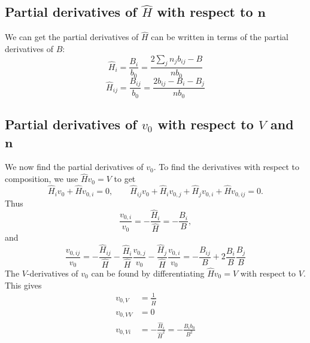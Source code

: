 \documentclass[internal,english]{sintefmemo2012}
\newcommand{\mbn}[0]{\mathbf n}
\newcommand*{\hH}[0]{\hat H}
\numberwithin{equation}{section}
\begin{document}
\subsection*{Partial derivatives of $\hH$ with respect to $\mbn$}
We can get the partial derivatives of $\hH$ can be written in terms of
the partial derivatives of $B$:
\begin{equation}
  \hH_i = \frac{B_i}{b_0} = \frac{2 \sum_j n_j b_{ij} -B}{nb_0}
\end{equation}
\begin{equation}
  \hH_{ij} = \frac{B_{ij}}{b_0} = \frac{2b_{ij}-B_i-B_j}{nb_0}
\end{equation}
\subsection*{Partial derivatives of $v_0$ with respect to $V$ and
  $\mbn$}
We now find the partial derivatives of $v_0$. To find the derivatives
with respect to composition, we use $\hH v_0 = V$ to get
$$
\hH_i v_0 + \hH v_{0,i} = 0, \qquad \hH_{ij} v_0 + \hH_i v_{0,j} +
\hH_j v_{0,i} + \hH v_{0,ij} = 0.
$$
Thus
\begin{equation}
  \frac{v_{0,i}}{v_0} = - \frac{\hH_i}{\hH} = - \frac{B_i}{B},
\end{equation}
and
\begin{equation}
  \frac{v_{0,ij}}{v_0} = -\frac{\hH_{ij}}{\hH} - \frac{\hH_i}{\hH} \frac{v_{0,j}}{v_0} - \frac{\hH_j}{\hH} \frac{v_{0,i}}{v_0} = -\frac{B_{ij}}{B} + 2 \frac{B_i}{B} \frac{B_j}{B}
\end{equation}
The $V$-derivatives of $v_0$ can be found by differentiating $\hH v_0
= V$ with respect to $V$. This gives
\begin{align}
  v_{0,V}  &= \frac{1}{\hH} \\
  v_{0,VV} &= 0 \\
  v_{0,Vi} &= -\frac{\hH_i}{\hH^2} = -\frac{B_i b_0}{B^2}
\end{align}
\end{document}
